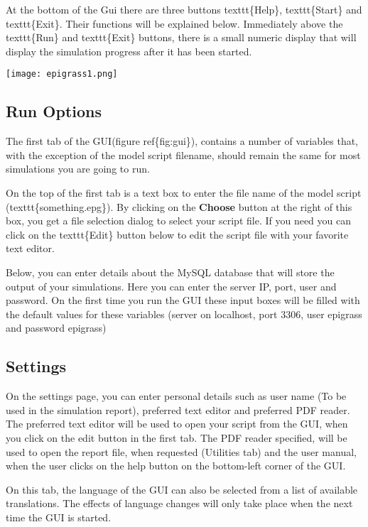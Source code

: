 \documentclass[a4paper,10pt]{manual}
\begin{document}
At the bottom of the Gui there are three buttons texttt\{Help\}, texttt\{Start\} and texttt\{Exit\}. Their functions will be explained below. Immediately above the texttt\{Run\} and texttt\{Exit\} buttons, there is a small numeric display that will display the simulation progress after it has been started.

\texttt{[image: epigrass1.png]}


\subsection{Run Options}

The first tab of the GUI(figure ref\{fig:gui\}), contains a number of variables that, with the exception of the model script filename, should remain the same for most simulations you are going to run.

On the top of the first tab is a text box to enter the file name of the model script (texttt\{something.epg\}). By clicking on the \textbf{Choose} button at the right of this box, you get a file selection dialog to select your script file. If you need you can click on the texttt\{Edit\} button below to edit the script file with your favorite text editor.

Below, you can enter details about the MySQL database that will store the output of your simulations. Here you can enter the server IP, port, user and password. On the first time you run the GUI these input boxes will be filled with the default values for these variables (server on localhost, port 3306, user epigrass and password epigrass)


\subsection{Settings}

On the settings page, you can enter personal details such as user name (To be used in the simulation report), preferred text editor and preferred PDF reader. The preferred text editor will be used to open your script from the GUI, when you click on the edit button in the first tab. The PDF reader specified, will be used to open the report file, when requested (Utilities tab) and the user manual, when the user clicks on the help button on the bottom-left corner of the GUI.

On this tab, the language of the GUI can also be selected from a list of available translations. The effects of language changes will only take place when the next time the GUI is started.
\end{document}
